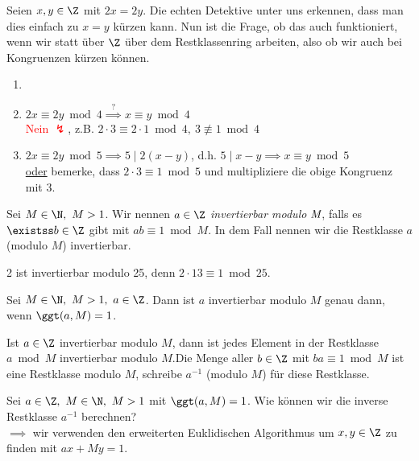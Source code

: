 Seien \( x,y \in \Z \) mit $2x = 2y $. Die echten Detektive unter uns erkennen, dass man dies einfach zu $x = y$ kürzen kann. Nun ist die Frage, ob das auch funktioniert, wenn wir statt über $\Z$ über dem Restklassenring arbeiten, also ob wir auch bei Kongruenzen kürzen können.

\begin{exmp*}
	\begin{enumerate}
		\item[]
		\item \( 2x \equiv 2y \bmod 4 \overset{?}{\implies} x \equiv y \bmod 4 \)\\
			\textcolor{red}{Nein $\lightning$}, z.B. \( 2 \cdot 3 \equiv 2 \cdot 1 \bmod 4,\ 3 \not\equiv 1 \bmod 4 \)
		\item \( 2x \equiv 2y \bmod 5 \implies 5 \mid 2(x-y) \), d.h. \( 5 \mid x-y \implies x \equiv y \bmod 5 \)\\
			\underline{oder} bemerke, dass \( 2 \cdot 3 \equiv 1 \bmod 5 \) und multipliziere die obige Kongruenz mit 3.
	\end{enumerate}
\end{exmp*}

\begin{defn*}
	Sei \( M \in \N,\ M > 1 \). Wir nennen \( a \in \Z \) \emph{invertierbar modulo $\emph{M}$}, falls es \( \existss b \in \Z \) gibt mit \( ab \equiv 1 \bmod M \). In dem Fall nennen wir die Restklasse \( a\) (modulo $M$) invertierbar.
\end{defn*}

\begin{exmp*}
	2 ist invertierbar modulo 25, denn \( 2 \cdot 13 \equiv 1 \bmod 25 \).
\end{exmp*}

\begin{thm}\autolabel
	Sei \( M \in \N,\ M > 1,\ a \in \Z \). Dann ist $a$ invertierbar modulo $M$ genau dann, wenn \( \ggt(a,M) = 1 \).
\end{thm}

\begin{rem*}
	Ist \( a \in \Z \) invertierbar modulo $M$, dann ist jedes Element in der Restklasse $a \bmod M$ invertierbar modulo $M$.\video Die Menge aller $b \in \Z$ mit $ba \equiv 1 \bmod M$ ist eine Restklasse modulo $M$, schreibe $a^{-1}$ (modulo $M$) für diese Restklasse.
\end{rem*}

Sei \( a \in \Z,\ M \in \N,\ M > 1 \) mit \( \ggt(a,M) = 1 \). Wie können wir die inverse Restklasse $a^{-1}$ berechnen?\\
$\implies$ wir verwenden den erweiterten Euklidischen Algorithmus um \( x,y \in \Z \) zu finden mit \( ax+My = 1 \).


